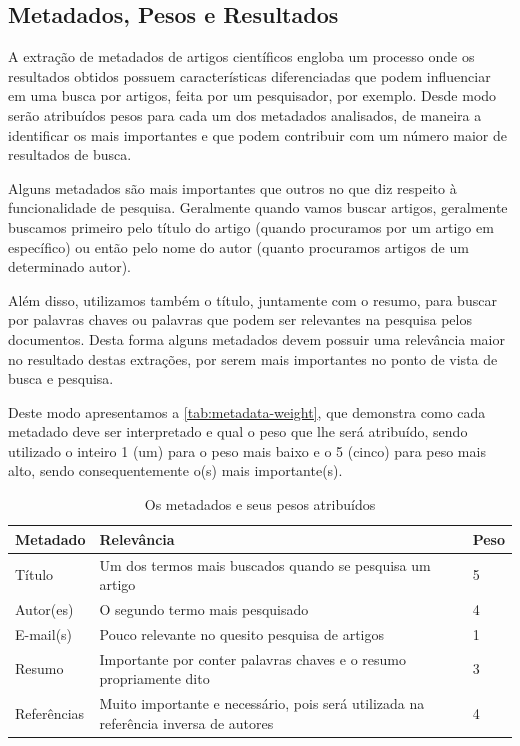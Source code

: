 \subsection{Metadados, Pesos e Resultados}
\label{ssec:metadata-results}


A extração de metadados de artigos científicos engloba um processo onde os resultados obtidos possuem características diferenciadas que podem influenciar em uma busca por artigos, feita por um pesquisador, por exemplo. Desde modo serão atribuídos pesos para cada um dos metadados analisados, de maneira a identificar os mais importantes e que podem contribuir com um número maior de resultados de busca. 


Alguns metadados são mais importantes que outros no que diz respeito à funcionalidade de pesquisa. Geralmente quando vamos buscar artigos, geralmente buscamos primeiro pelo título do artigo (quando procuramos por um artigo em específico) ou então pelo nome do autor (quanto procuramos artigos de um determinado autor).

Além disso, utilizamos também o título, juntamente com o resumo, para buscar por palavras chaves ou palavras que podem ser relevantes na pesquisa pelos documentos. Desta forma alguns metadados devem possuir uma relevância maior no resultado destas extrações, por serem mais importantes no ponto de vista de busca e pesquisa.

Deste modo apresentamos a \autoref{tab:metadata-weight}, que demonstra como cada metadado deve ser interpretado e qual o peso que lhe será atribuído, sendo utilizado o inteiro 1 (um) para o peso mais baixo e o 5 (cinco) para peso mais alto, sendo consequentemente o(s) mais importante(s).


\begin{table}
    \caption{Os metadados e seus pesos atribuídos}
    \begin{center}
        \begin{tabular}{|p{3cm}|p{8cm}|C{1cm}|}
            \hline \textbf{Metadado} & \textbf{Relevância} & \textbf{Peso} \\ 
            \hline Título & Um dos termos mais buscados quando se pesquisa um artigo & 5 \\
            \hline Autor(es) & O segundo termo mais pesquisado & 4 \\
            \hline E-mail(s) & Pouco relevante no quesito pesquisa de artigos & 1 \\
            \hline Resumo & Importante por conter palavras chaves e o resumo propriamente dito & 3 \\
            \hline Referências & Muito importante e necessário, pois será utilizada na referência inversa de autores & 4 \\
            \hline 
        \end{tabular} 
    \end{center}
    \label{tab:metadata-weight}
\end{table}

